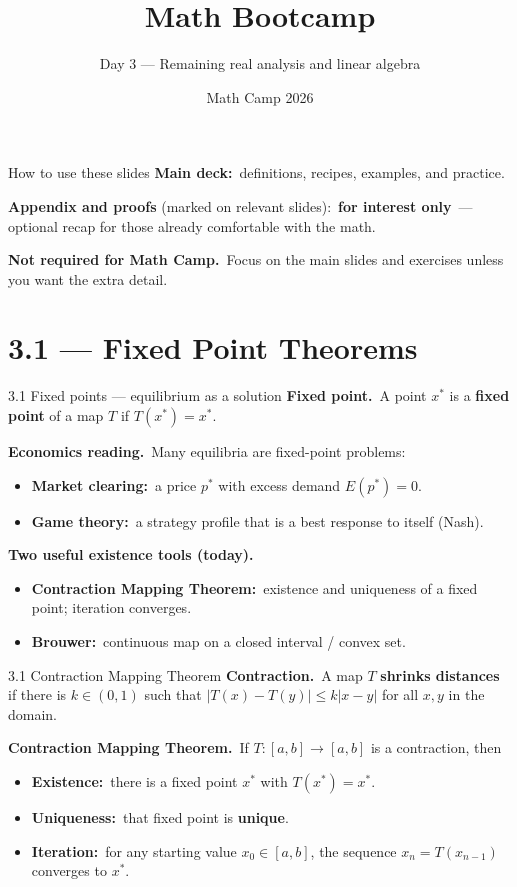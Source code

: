 \documentclass[11pt,aspectratio=169]{beamer}
\title{Math Bootcamp}
\subtitle{Day 3 --- Remaining real analysis and linear algebra}
\author{Math Camp 2026}
\date{}
\newcommand{\InterestOnly}{\textcolor{mAccent}{\textbf{for interest only}}}
\begin{document}
\begin{frame}
  \titlepage
\end{frame}

\begin{frame}{How to use these slides}
  \small
  \textbf{Main deck:}\ definitions, recipes, examples, and practice.

  \medskip
  \textbf{Appendix and proofs} (marked on relevant slides):\
  \InterestOnly\ --- optional recap for those already comfortable with the math.

  \medskip
  \textbf{Not required for Math Camp.}\
  Focus on the main slides and exercises unless you want the extra detail.
\end{frame}

\section{3.1 --- Fixed Point Theorems}

\begin{frame}{3.1 Fixed points --- equilibrium as a solution}
  \footnotesize
  \textbf{Fixed point.}\ A point $x^*$ is a \textbf{fixed point} of a map $T$ if $T(x^*)=x^*$.

  \medskip
  \textbf{Economics reading.}\ Many equilibria are fixed-point problems:
  \begin{itemize}
    \item \textbf{Market clearing:}\ a price $p^*$ with excess demand $E(p^*)=0$.
    \item \textbf{Game theory:}\ a strategy profile that is a best response to itself (Nash).
  \end{itemize}

  \medskip
  \textbf{Two useful existence tools (today).}
  \begin{itemize}
    \item \textbf{Contraction Mapping Theorem:}\ existence and uniqueness of a fixed point; iteration converges.
    \item \textbf{Brouwer:}\ continuous map on a closed interval / convex set.
  \end{itemize}
\end{frame}

\begin{frame}{3.1 Contraction Mapping Theorem}
  \footnotesize
  \textbf{Contraction.}\ A map $T$ \textbf{shrinks distances} if there is $k\in(0,1)$ such that
  $|T(x)-T(y)|\le k|x-y|$ for all $x,y$ in the domain.

  \medskip
  \textbf{Contraction Mapping Theorem.}\ If $T\colon[a,b]\to[a,b]$ is a contraction, then
  \begin{itemize}
    \item \textbf{Existence:}\ there is a fixed point $x^*$ with $T(x^*)=x^*$.
    \item \textbf{Uniqueness:}\ that fixed point is \textbf{unique}.
    \item \textbf{Iteration:}\ for any starting value $x_0\in[a,b]$, the sequence
      $x_n=T(x_{n-1})$ converges to $x^*$.
  \end{itemize}
\end{frame}
\end{document}
